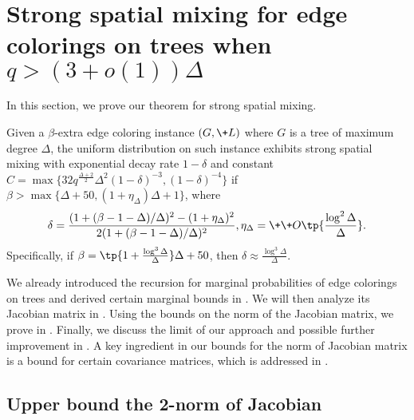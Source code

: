 \documentclass[a4paper,11pt]{article}
\begin{document}
 \section{Strong spatial mixing for edge colorings on trees when $q>(3+o(1))\Delta$}\label{sec:ssm}

In this section, we prove our theorem for strong spatial mixing.

\begin{theorem}\label{thm:SSM}
    Given a $\beta$-extra edge coloring instance $(G,\+L)$ where $G$ is a tree of maximum degree $\Delta$, the uniform distribution on such instance exhibits strong spatial mixing with exponential decay rate $1-\delta$ and constant $C = \max\{32q^{\frac{\Delta + 2}2}\Delta^2(1-\delta)^{-3},(1-\delta)^{-4}\}$ if $\beta > \max\{\Delta + 50, (1 + \eta_\Delta)\Delta + 1\}$, where
    \[
         \delta = \frac{(1 + (\beta - 1 -\Delta)/\Delta)^2 - (1+\eta_{\Delta})^2}{2(1 + (\beta - 1 -\Delta)/\Delta)^2}, \eta_{\Delta} = \+\+O\tp{\frac{\log^2 \Delta}{\Delta}}.
    \]
    Specifically, if $\beta = \tp{1 + \frac{\log^3 \Delta}{\Delta}}\Delta + 50$, then $\delta \approx \frac{\log^3 \Delta}{\Delta}$.
 \end{theorem}
 


We already introduced the recursion for marginal probabilities of edge colorings on trees and derived certain marginal bounds in .  We will then analyze its Jacobian matrix in . Using the bounds on the norm of the Jacobian matrix, we prove  in . Finally, we discuss the limit of our approach and possible further improvement in . A key ingredient in our bounds for the norm of Jacobian matrix is a bound for certain covariance matrices, which is addressed in . 


\subsection{Upper bound the 2-norm of Jacobian}\label{sec:jacobian}
\end{document}
